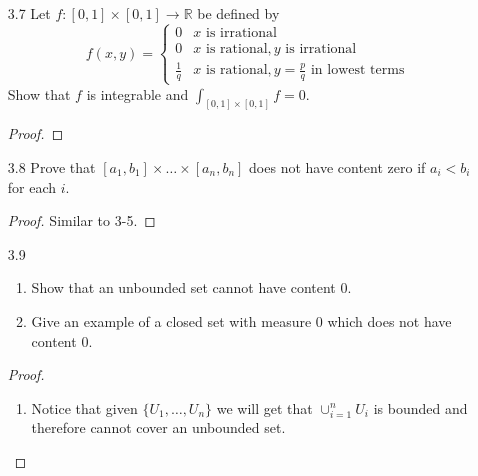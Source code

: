 \begin{enumerate}
\begin{proof}
\begin{enumerate}
        \item Either \( M_S(\left| f \right|) = M_S(f) \) or \( M_S(\left| f \right|) = -m_S(f) \). 
    \end{enumerate}
    If \( M_S(\left| f \right|) = M_S(f) \) then
    \[
    M_S(\left| f \right|) - m_S(\left| f \right|) = M_S(f) - m_S(\left| f \right|) \leq M_S(f) - m_S(f)
    \]
    where the inequality comes from (a). If \( M_S(\left| f \right|) = -m_S(f) \) then
    \[
    M_S(\left| f \right|) - m_S(\left| f \right|) \leq M_S(\left| f \right|) = -m_S(f) \leq M_S(f) - m_S(f)
    \]
    Thus
    \[
    M_S(\left| f \right|) - m_S(\left| f \right|) \leq M_S(f) - m_S(f)
    \]
    which implies that \( \left| f \right| \) is integrable and
    \[
    \left| \int_A f \right| \leq \int_A \left| f \right|
    \]
    follows from the fact that \( \left| M_S(f) \right| \leq M_S(\left| f \right|) \), the integrability of \( \left| f \right| \), and the triangle inequality. 
    \end{proof}
    
    \item[3.7] Let \( f: [0,1] \times [0,1] \rightarrow \mathbb{R} \) be defined by
    \[
    f(x,y) = \begin{cases} 0 &  x  \text{ is irrational} \\ 0 & x \text{ is rational}, y \text{ is irrational} \\ \frac{1}{q} & x \text{ is rational}, y = \frac{p}{q} \text{ in lowest terms} \end{cases}
    \]
    Show that \( f \) is integrable and \( \int_{[0,1] \times [0,1]}f = 0 \).
    \begin{proof}
    
    \end{proof}
    
    \item[3.8] Prove that \( [a_1,b_1] \times \ldots \times [a_n,b_n] \) does not have content zero if \( a_i < b_i \) for each \( i \).
    \begin{proof}
    Similar to 3-5.
    \end{proof}
    
    \item [3.9] \begin{enumerate}
        \item Show that an unbounded set cannot have content \( 0 \).
        
        \item Give an example of a closed set with measure \( 0 \) which does not have content \( 0 \).
    \end{enumerate}
    \begin{proof}
    \begin{enumerate}
        \item Notice that given \( \{ U_1,\ldots,U_n \} \) we will get that \( \cup_{i=1}^n U_i \) is bounded and therefore cannot cover an unbounded set.
        

\end{enumerate}
\end{proof}
\end{enumerate}
